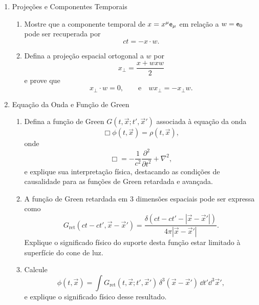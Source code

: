 \begin{enumerate}
      \item Projeções e Componentes Temporais

            \begin{enumerate}
                  \item Mostre que a componente temporal de $x = x^\mu \mathsf{e}_\mu$ em
                        relação a $w = \mathsf{e}_0$ pode ser recuperada por
                        $$ct = - x \cdot w.$$

                  \item Defina a projeção espacial ortogonal a $w$ por
                        $$x_\perp = \frac{x + w x w}{2}$$
                        e prove que
                        $$x_\perp \cdot w = 0,\qquad\text{e}\quad wx_\perp = -x_\perp w.$$
            \end{enumerate}

      \item Equação da Onda e Função de Green

            \begin{enumerate}
                  \item Defina a função de Green $G(t, \vec{x}; t', \vec{x}')$ associada
                        à equação da onda
                        $$\Box \phi(t, \vec{x}) = \rho(t, \vec{x}),$$
                        onde
                        $$\Box = -\frac{1}{c^2} \frac{\partial^2}{\partial t^2} +
                              \nabla^2,$$ e explique sua interpretação física, destacando as
                        condições de causalidade para as funções de Green retardada e
                        avançada.

                  \item A função de Green retardada em 3 dimensões espaciais pode ser
                        expressa como
                        $$
                              G_{\mathrm{ret}}(ct - ct', \vec{x} - \vec{x}') =
                              \frac{\delta\left(ct - ct' - |\vec{x} - \vec{x}'|\right)}{4\pi |\vec{x} - \vec{x}'|}.
                        $$
                        Explique o significado físico do suporte desta função estar
                        limitado à superfície do cone de luz.

                  \item Calcule
                        $$
                              \phi(t,\vec{x}) = \int G_{\mathrm{ret}}(t, \vec{x}; t', \vec{x}') \, \delta^3(\vec{x} - \vec{x}') \, \dd t' \dd^3 \vec{x}',
                        $$
                        e explique o significado físico desse resultado.
            \end{enumerate}

\end{enumerate}


